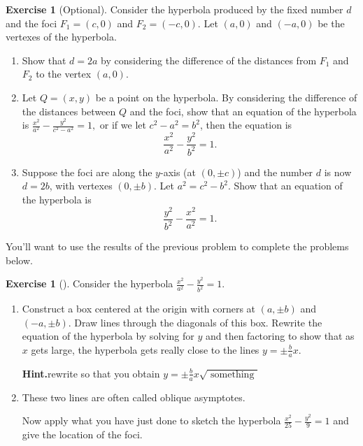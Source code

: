 \documentclass[10pt,]{book}
\theoremstyle{plain}
\theoremstyle{definition}
\theoremstyle{definition}
\theoremstyle{definition}
\theoremstyle{definition}
\newtheorem{exploration}[project]{Exercise}
\theoremstyle{definition}
\numberwithin{equation}{section}
\begin{document}
\begin{exploration}[Optional]\label{exploration-66}
Consider the hyperbola produced by the fixed number \(d\) and the foci \(F_1=(c,0)\) and \(F_2=(-c,0)\). Let \((a,0)\) and \((-a,0)\) be the vertexes of the hyperbola.%
\begin{enumerate}[font=\bfseries,label=(\alph*),ref=\alph*]
\item\label{task-109} Show that \(d=2a\) by considering the difference of the distances from \(F_1\) and \(F_2\) to the vertex \((a,0)\).%
\item\label{task-110} Let \(Q=(x,y)\) be a point on the hyperbola. By considering the difference of the distances between \(Q\) and the foci, show that an equation of the hyperbola is \(\frac{x^2}{a^2}-\frac{y^2}{c^2-a^2}=1,\) or if we let \(c^2-a^2=b^2\), then the equation is%
\begin{equation*}
\frac{x^2}{a^2}-\frac{y^2}{b^2}=1.
\end{equation*}
%
\item\label{task-111} Suppose the foci are along the \(y\)-axis (at \((0,\pm c)\)) and the number \(d\) is now \(d=2b\), with vertexes \((0,\pm b)\). Let \(a^2=c^2-b^2\). Show that an equation of the hyperbola is%
\begin{equation*}
\frac{y^2}{b^2}-\frac{x^2}{a^2}=1.
\end{equation*}
%
\end{enumerate}
\end{exploration}
You'll want to use the results of the previous problem to complete the problems below.%
\begin{exploration}[]\label{exploration-67}
Consider the hyperbola \(\frac{x^2}{a^2}-\frac{y^2}{b^2}=1.\)%
\begin{enumerate}[font=\bfseries,label=(\alph*),ref=\alph*]
\item\label{task-112} Construct a box centered at the origin with corners at \((a, \pm b)\) and \((-a,\pm b)\). Draw lines through the diagonals of this box. Rewrite the equation of the hyperbola by solving for \(y\) and then factoring to show that as \(x\) gets large, the hyperbola gets really close to the lines \(y=\pm \frac{b}{a}x\).%
\par\medskip\noindent%
\textbf{Hint.}\quad rewrite so that you obtain \(y=\pm\frac{b}{a}x\sqrt{\text{ something } }\)%
\item\label{task-113} These two lines are often called oblique asymptotes.%
\par
Now apply what you have just done to sketch the hyperbola \(\frac{x^2}{25}-\frac{y^2}{9}=1\) and give the location of the foci.%
\end{enumerate}
\end{exploration}
\end{document}
